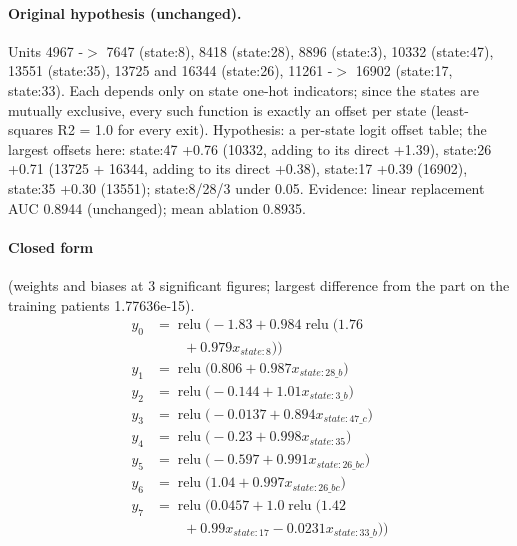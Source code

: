 \documentclass[a4paper,10pt]{article}
\newif\ifreviewmarks
\newcommand{\reviewrule}{\noindent{\color{BrickRed}\rule{\linewidth}{0.8pt}}}
\newenvironment{drafted}[1][]{%
  \ifreviewmarks\par\addvspace{\medskipamount}\reviewrule\par\nopagebreak
  \noindent{\color{BrickRed}\sffamily\footnotesize\textbf{Thesis Draft}\quad #1\hfill review}\par\nopagebreak\smallskip\fi}{%
  \ifreviewmarks\par\smallskip\noindent{\color{BrickRed}\sffamily\footnotesize end of thesis draft}\par\nopagebreak\reviewrule\par\medskip\fi}
\begin{document}
\begin{drafted}[plain-language layer: churn100-s2-c2]
\paragraph{Original hypothesis (unchanged).} Units 4967 -$>$ 7647 (state:8), 8418 (state:28), 8896 (state:3), 10332 (state:47), 13551 (state:35), 13725 and 16344 (state:26), 11261 -$>$ 16902 (state:17, state:33). Each depends only on state one-hot indicators; since the states are mutually exclusive, every such function is exactly an offset per state (least-squares R2 = 1.0 for every exit). Hypothesis: a per-state logit offset table; the largest offsets here: state:47 +0.76 (10332, adding to its direct +1.39), state:26 +0.71 (13725 + 16344, adding to its direct +0.38), state:17 +0.39 (16902), state:35 +0.30 (13551); state:8/28/3 under 0.05. Evidence: linear replacement AUC 0.8944 (unchanged); mean ablation 0.8935.
\paragraph{Closed form} {\footnotesize(weights and biases at 3 significant figures; largest difference from the part on the training patients 1.77636e-15).}
{\small\begingroup\allowdisplaybreaks
\begin{align*}
y_{0} &= \operatorname{relu}\bigl(-1.83 + 0.984 \operatorname{relu}\bigl(1.76 \\
&\qquad + 0.979 x_{state:8}\bigr)\bigr) \\
y_{1} &= \operatorname{relu}\bigl(0.806 + 0.987 x_{state:28\_b}\bigr) \\
y_{2} &= \operatorname{relu}\bigl(-0.144 + 1.01 x_{state:3\_b}\bigr) \\
y_{3} &= \operatorname{relu}\bigl(-0.0137 + 0.894 x_{state:47\_c}\bigr) \\
y_{4} &= \operatorname{relu}\bigl(-0.23 + 0.998 x_{state:35}\bigr) \\
y_{5} &= \operatorname{relu}\bigl(-0.597 + 0.991 x_{state:26\_bc}\bigr) \\
y_{6} &= \operatorname{relu}\bigl(1.04 + 0.997 x_{state:26\_bc}\bigr) \\
y_{7} &= \operatorname{relu}\bigl(0.0457 + 1.0 \operatorname{relu}\bigl(1.42 \\
&\qquad + 0.99 x_{state:17} - 0.0231 x_{state:33\_b}\bigr)\bigr)
\end{align*}\endgroup}


\end{drafted}
\end{document}

